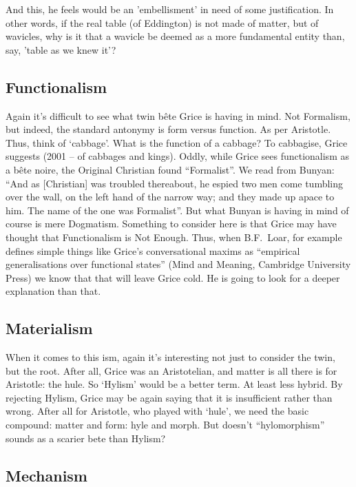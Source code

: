 \documentclass[10pt,titlepage]{book}
\begin{document}
{And this, he feels would be an 'embellisment' in need of some
justification. In other words, if the real table (of Eddington) is not
made of matter, but of wavicles, why is it that a wavicle be deemed as
a more fundamental entity than, say, 'table as we knew it'?

\subsection{Functionalism}

Again it’s difficult to see what twin bête Grice is having 
in mind. Not  Formalism, but indeed, the standard antonymy is form versus 
function. As per  Aristotle. Thus, think of ‘cabbage’. What is the function 
of a cabbage? To  cabbagise, Grice suggests (2001 – of cabbages and kings). 
Oddly, while Grice  sees functionalism as a bête noire, the Original 
Christian found “Formalist”. We  read from Bunyan: “And as [Christian] was troubled 
thereabout, he espied  two men come tumbling over the wall, on the left 
hand of the narrow way; and  they made up apace to him. The name of the one was 
Formalist”. But what Bunyan  is having in mind of course is mere Dogmatism. 
Something to consider here is  that Grice may have thought that 
Functionalism is Not Enough. Thus, when B.F.~Loar, for example defines simple things 
like Grice’s conversational maxims as  “empirical generalisations over 
functional states” (Mind and Meaning, Cambridge  University Press) we know that 
that will leave Grice cold. He is going to look  for a deeper explanation 
than that. 

\subsection{Materialism}

When  it comes to this ism, again it’s interesting not just to 
consider the twin, but  the root. After all, Grice was an Aristotelian, and 
matter is all there is for  Aristotle: the hule. So ‘Hylism’ would be a 
better term. At least less hybrid.  By rejecting Hylism, Grice may be again 
saying that it is insufficient rather  than wrong. After all for Aristotle, 
who played with ‘hule’, we need the basic  compound: matter and form: hyle 
and morph. But doesn’t “hylomorphism” sounds as  a scarier bete than Hylism? 

\subsection{Mechanism}

}
\end{document}
